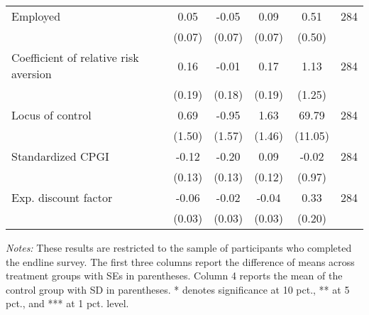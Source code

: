 \begin{table}[h]
{\begin{threeparttable}
\begin{tabular}{l*{5}{c}}
Employed  &     0.05&    -0.05&     0.09&     0.51&      284\\
          &   (0.07)&   (0.07)&   (0.07)&   (0.50)&         \\
Coefficient of relative risk aversion&     0.16&    -0.01&     0.17&     1.13&      284\\
          &   (0.19)&   (0.18)&   (0.19)&   (1.25)&         \\
Locus of control&     0.69&    -0.95&     1.63&    69.79&      284\\
          &   (1.50)&   (1.57)&   (1.46)&  (11.05)&         \\
Standardized CPGI&    -0.12&    -0.20&     0.09&    -0.02&      284\\
          &   (0.13)&   (0.13)&   (0.12)&   (0.97)&         \\
Exp. discount factor&-0.06\sym{*}&    -0.02&    -0.04&     0.33&      284\\
          &   (0.03)&   (0.03)&   (0.03)&   (0.20)&         \\
\bottomrule \end{tabular} \begin{tablenotes}[flushleft] \footnotesize \item \emph{Notes:} These results are restricted to the sample of participants who completed the endline survey. The first three columns report the difference of means across treatment groups with SEs in parentheses. Column 4 reports the mean of the control group with SD in parentheses. * denotes significance at 10 pct., ** at 5 pct., and *** at 1 pct. level. \end{tablenotes} \end{threeparttable} } \end{table}

